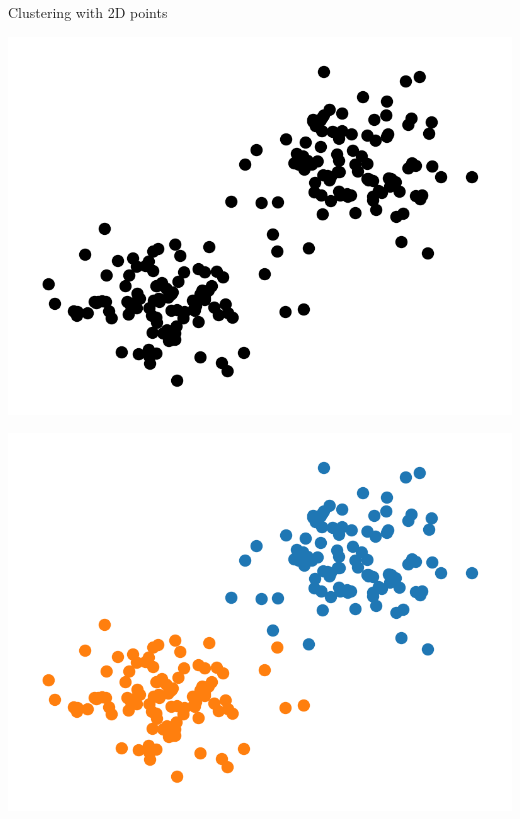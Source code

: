 \begin{example}[!t]
    \centering
    \caption{Clustering with 2D points}
    \label{ex:clustering}

    \begin{subexample}{\linewidth}
      \centering
      \includegraphics[width=0.9\linewidth]{img/clustering_example_1.png}
    \end{subexample}

    \vspace{0.5cm}

    \begin{subexample}{\linewidth}
      \centering
      \includegraphics[width=0.9\linewidth]{img/clustering_example_2.png}
    \end{subexample}
\end{example}

